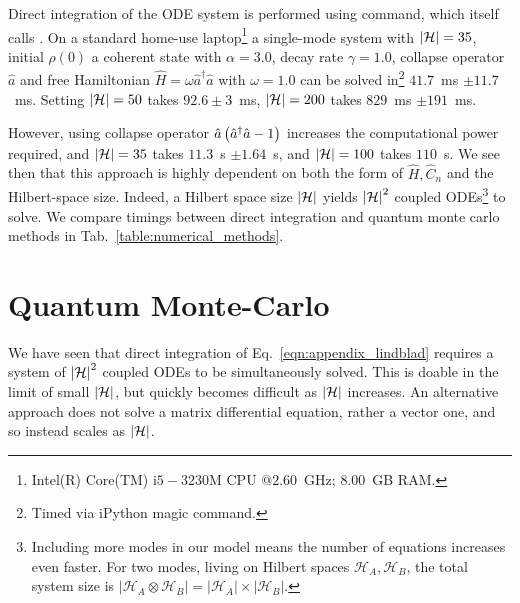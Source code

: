 Direct integration of the ODE system is performed using  command, which itself calls . On a standard home-use laptop\footnote{Intel(R) Core(TM) i$5-3230$M CPU $@ 2.60$~GHz; $8.00$~GB RAM.} a single-mode system with $\left|\mathcal{H}\right| = 35$, initial $\rho\left(0\right)$ a coherent state with $\alpha = 3.0$, decay rate $\gamma = 1.0$, collapse operator $\hat{a}$ and free Hamiltonian $\hat{H} = \omega \hat{a}^\dagger \hat{a}$ with $\omega = 1.0$ can be solved in\footnote{Timed via iPython  magic command.} $41.7$~ms $\pm 11.7$~ms. Setting $\left|\mathcal{H}\right| = 50$ takes $92.6 \pm 3$~ms, $\left|\mathcal{H}\right| = 200$ takes $829$~ms $\pm 191$~ms.

However, using collapse operator $\hat{a}\left(\hat{a}^\dagger \hat{a} - 1\right)$ increases the computational power required, %
and $\left|\mathcal{H}\right| = 35$ takes $11.3$~s $\pm 1.64$~s, and $\left|\mathcal{H}\right|=100$ takes $110$~s. %
We see then that this approach is highly dependent on both the form of $\hat{H}, \hat{C}_n$ and the Hilbert-space size. Indeed, a Hilbert space size $\left|\mathcal{H}\right|$ yields $\left|\mathcal{H}\right|^2$ coupled ODEs\footnote{Including more modes in our model means the number of equations increases even faster. For two modes, living on Hilbert spaces $\mathcal{H}_A, \mathcal{H}_B$, the total system size is $\left| \mathcal{H}_A \otimes \mathcal{H}_B \right| = \left|\mathcal{H}_A\right| \times \left| \mathcal{H}_B\right|$.} to solve. We compare timings between direct integration and quantum monte carlo methods in Tab.~\ref{table:numerical_methods}.



\section{Quantum Monte-Carlo}\label{appendix:monte_carlo}
We have seen that direct integration of Eq.~\ref{eqn:appendix_lindblad} requires a system of $\left|\mathcal{H}\right|^2$ coupled ODEs to be simultaneously solved. This is doable in the limit of small $\left|\mathcal{H}\right|$, but quickly becomes difficult as $\left|\mathcal{H}\right|$ increases. An alternative approach does not solve a matrix differential equation, rather a vector one, and so instead scales as $\left|\mathcal{H}\right|$.


